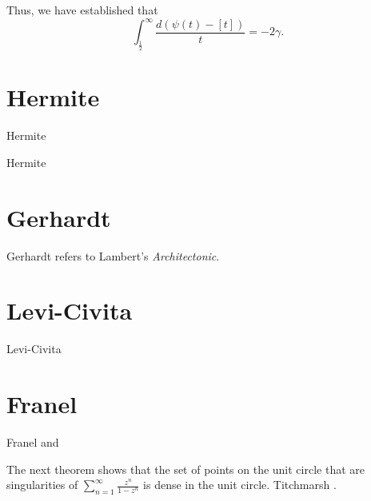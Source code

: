 \documentclass{article}
\begin{document}
Thus, we have established that
\[
\int_{\frac{1}{2}}^\infty \frac{d(\psi(t)-[t])}{t} = -2\gamma.
\]


\section{Hermite}
Hermite \cite{hermite1884}

Hermite \cite{hermite}


\section{Gerhardt}
Gerhardt \cite[p.~196]{gerhardt} refers to Lambert's {\em Architectonic}. 

\section{Levi-Civita}
Levi-Civita \cite{levicivita}


\section{Franel}
Franel \cite{franel51} and \cite{franel52}



The next theorem shows that  
 the set of points on the unit circle that are singularities of $\sum_{n=1}^\infty \frac{z^n}{1-z^n}$ is dense in the unit
circle. Titchmarsh \cite[pp.~160--161, \S 4.71]{titchmarsh}.
\end{document}
